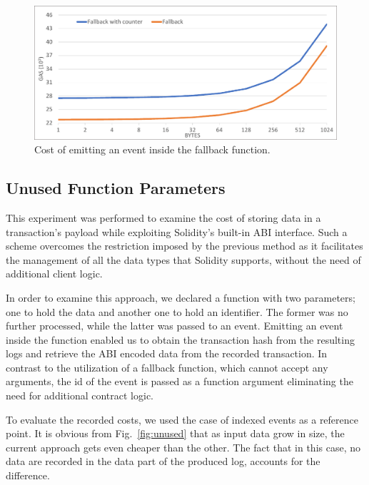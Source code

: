 \begin{figure}[htbp]
\centerline{\includegraphics[width=\textwidth]{figs/fallback.pdf}}
\caption{Cost of emitting an event inside the fallback function.}
\label{fig:fallback}
\end{figure}

\subsection{Unused Function Parameters}\label{subsection:evaluation_unused}
This experiment was performed to examine the cost of storing data in a transaction’s payload while exploiting Solidity’s built-in ABI interface.
Such a scheme overcomes the restriction imposed by the previous method as it facilitates the management of all the data types that Solidity supports, without the need of additional client logic. 

In order to examine this approach, we declared a function with two parameters; one to hold the data and another one to hold an identifier. The former was no further processed, while the latter was passed to an event. Emitting an event inside the function enabled us to obtain the transaction hash from the resulting logs and retrieve the ABI encoded data from the recorded transaction. In contrast to the utilization of a fallback function, which cannot accept any arguments, the id of the event is passed as a function argument eliminating the need for additional contract logic.

To evaluate the recorded costs, we used the case of indexed events as a reference point. It is obvious from Fig.~\ref{fig:unused} that as input data grow in size, the current approach gets even cheaper than the other. The fact that in this case, no data are recorded in the data part of the produced log, accounts for the difference.

